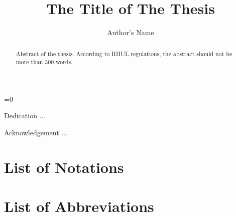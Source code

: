 \documentclass[pdf,watermark]{isg-thesis}
\author{Author's Name}
\title{The Title of The Thesis}
\def\chapterPrinting{0}
\begin{document}
\ifnum\chapterPrinting=0

\maketitle
\declaration

\begin{dedication}
Dedication ...
\end{dedication}

\begin{acknowledgement}
Acknowledgement ...
\end{acknowledgement}

\begin{abstract}
Abstract of the thesis. According to RHUL regulations, 
the abstract should not be more than 300 words.
\end{abstract}

\tableofcontents 
\listoffigures \clearpage
\listoftables \clearpage

\chapter*{List of Notations}

\clearpage

\chapter*{List of Abbreviations}

\clearpage
\end{document}
